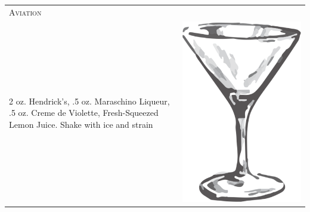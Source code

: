 \documentclass{article}
\begin{document}
\begin{tabular}{p{2in} p{0.5in}}
	\multicolumn{2}{p{3in}}{\centering\Huge\textsc{Aviation}}\\ 
	  \vspace{-0.1in} 2 oz. Hendrick's, .5 oz. Maraschino Liqueur, .5 oz. Creme de Violette, Fresh-Squeezed Lemon Juice. Shake with ice and strain &
	  \vspace{-0.1in} \includegraphics{goblet.png}
\end{tabular}\\
\end{document}
